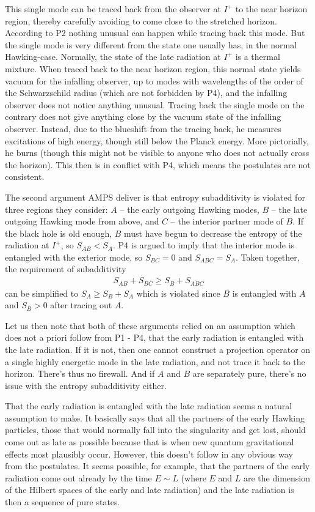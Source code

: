 \documentclass[11pt,twoside]{article}
\def\beqn{\begin{eqnarray}}
\def\eeqn{\end{eqnarray}}
\begin{document}
This single mode can be traced back from the observer at $I^+$ to the near horizon
region, thereby carefully avoiding to come close to the stretched horizon. According to P2
nothing unusual can happen while tracing back this mode. But the single mode
is very different from the state one usually has, in the normal Hawking-case. Normally,
the state of the late radiation at $I^+$ is a thermal mixture. When traced back to the near 
horizon region, this normal state yields vacuum for the infalling observer, up to modes with 
wavelengths of the order of the Schwarzschild radius (which are not forbidden by P4), and the
infalling observer does not notice anything unusual. Tracing back the
single mode on the contrary does not give anything close by the vacuum state of the
infalling observer. Instead, due to the blueshift from the tracing back, he measures 
excitations of high energy, though still below the Planck energy. More pictorially, he burns (though
this might not be visible to anyone who does not actually cross the horizon). This then 
is in conflict with P4, which means the postulates are not consistent.

The second argument {\sc AMPS} deliver is that entropy subadditivity is violated
for three regions they consider: $A$ -- the early outgoing Hawking modes, $B$  -- the late 
outgoing Hawking mode from above, and $C$ -- the interior partner mode of $B$. If the
black hole is old enough, $B$ must have begun to decrease the entropy of the
radiation at $I^+$, so $S_{AB} < S_{A}$. P4 is argued to imply that the interior
mode is entangled with the exterior mode, so $S_{BC} = 0$ and $S_{ABC} = S_A$.
Taken together, the requirement of subadditivity
\beqn
S_{AB} + S_{BC} \geq S_B + S_{ABC} 
\eeqn
can be simplified to $S_A \geq S_B + S_A$ which is violated since $B$ is entangled
with $A$ and $S_B > 0$ after tracing out $A$. 

Let us then note that both of these arguments relied on an assumption which
does not a priori follow from P1 - P4, that the early radiation is
entangled with the late radiation. If it is not, then one cannot construct 
a projection operator on a single highly energetic mode in the late radiation,
and not trace it back to the horizon. There's thus no firewall. And if $A$ and
$B$ are separately pure, there's no issue with the entropy subadditivity either.

That the early radiation is entangled with the late radiation seems
a natural assumption to make. It basically says that all the partners of the
early Hawking particles, those that would normally fall into the singularity
and get lost, should come out as late as possible because that is when
new quantum gravitational effects most plausibly occur. However, this
doesn't follow in any obvious way from the postulates. It seems possible,
for example, that the partners of the early radiation come out already
by the time $E \sim L$ (where $E$ and $L$ are the dimension of the
Hilbert spaces of the early and late radiation) and the late radiation is 
then a sequence of pure states. 
\end{document}

